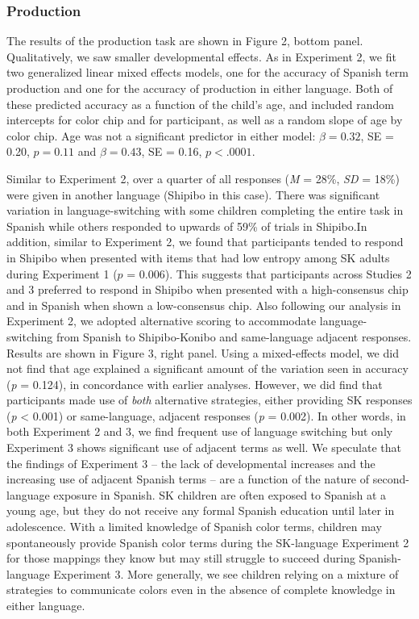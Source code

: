 \documentclass[,man,floatsintext]{apa6}
\theoremstyle{definition}
\theoremstyle{definition}
\theoremstyle{definition}
\theoremstyle{remark}
\begin{document}
\subsubsection{Production}\label{production-1}

The results of the production task are shown in Figure 2, bottom panel.
Qualitatively, we saw smaller developmental effects. As in Experiment 2,
we fit two generalized linear mixed effects models, one for the accuracy
of Spanish term production and one for the accuracy of production in
either language. Both of these predicted accuracy as a function of the
child's age, and included random intercepts for color chip and for
participant, as well as a random slope of age by color chip. Age was not
a significant predictor in either model: \(\beta = 0.32\), SE = 0.20,
\(p = 0.11\) and \(\beta = 0.43\), SE = 0.16, \(p < .0001\).

Similar to Experiment 2, over a quarter of all responses (\emph{M} =
28\%, \emph{SD} = 18\%) were given in another language (Shipibo in this
case). There was significant variation in language-switching with some
children completing the entire task in Spanish while others responded to
upwards of 59\% of trials in Shipibo.In addition, similar to Experiment
2, we found that participants tended to respond in Shipibo when
presented with items that had low entropy among SK adults during
Experiment 1 (\(p\) = 0.006). This suggests that participants across
Studies 2 and 3 preferred to respond in Shipibo when presented with a
high-consensus chip and in Spanish when shown a low-consensus chip. Also
following our analysis in Experiment 2, we adopted alternative scoring
to accommodate language-switching from Spanish to Shipibo-Konibo and
same-language adjacent responses. Results are shown in Figure 3, right
panel. Using a mixed-effects model, we did not find that age explained a
significant amount of the variation seen in accuracy (\emph{p} = 0.124),
in concordance with earlier analyses. However, we did find that
participants made use of \emph{both} alternative strategies, either
providing SK responses (\emph{p} \textless{} 0.001) or same-language,
adjacent responses (\emph{p} = 0.002). In other words, in both
Experiment 2 and 3, we find frequent use of language switching but only
Experiment 3 shows significant use of adjacent terms as well. We
speculate that the findings of Experiment 3 -- the lack of developmental
increases and the increasing use of adjacent Spanish terms -- are a
function of the nature of second-language exposure in Spanish. SK
children are often exposed to Spanish at a young age, but they do not
receive any formal Spanish education until later in adolescence. With a
limited knowledge of Spanish color terms, children may spontaneously
provide Spanish color terms during the SK-language Experiment 2 for
those mappings they know but may still struggle to succeed during
Spanish-language Experiment 3. More generally, we see children relying
on a mixture of strategies to communicate colors even in the absence of
complete knowledge in either language.
\end{document}
